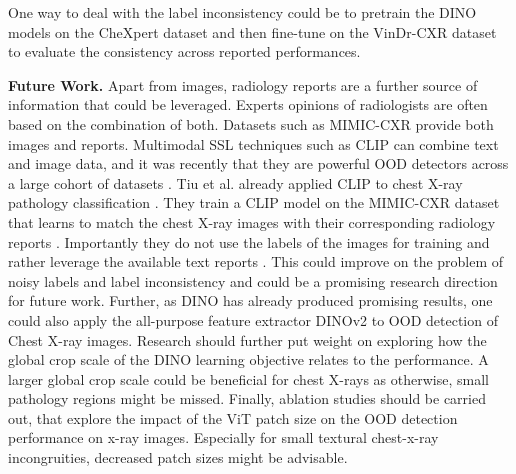 One way to deal with the label inconsistency could be to pretrain the DINO models on the CheXpert dataset and then fine-tune on the VinDr-CXR dataset to evaluate the consistency across reported performances.
\par
\textbf{Future Work.}
Apart from images, radiology reports are a further source of information that could be leveraged. 
Experts opinions of radiologists are often based on the combination of both. 
Datasets such as MIMIC-CXR \citep{Johnson2019} provide both images and reports. 
Multimodal SSL techniques such as CLIP \citep{Radford2021} can combine text and image data, and it was recently that they are powerful OOD detectors across a large cohort of datasets \citep{Michels2023}.
Tiu et al. already applied CLIP to chest X-ray pathology classification \citep{Tiu2022}.
They train a CLIP model on the MIMIC-CXR dataset that learns to match the chest X-ray images with their corresponding radiology reports \citep{Tiu2022}.
Importantly they do not use the labels of the images for training and rather leverage the available text reports \citep{Tiu2022}.
This could improve on the problem of noisy labels and label inconsistency and could be a promising research direction for future work.
Further, as DINO has already produced promising results, one could also apply the all-purpose feature extractor DINOv2 \citep{Oquab2023} to OOD detection of Chest X-ray images. 
Research should further put weight on exploring how the global crop scale of the DINO learning objective relates to the performance.
A larger global crop scale could be beneficial for chest X-rays as otherwise, small pathology regions might be missed.
Finally, ablation studies should be carried out, that explore the impact of the ViT patch size on the OOD detection performance on x-ray images.
Especially for small textural chest-x-ray incongruities, decreased patch sizes might be advisable.